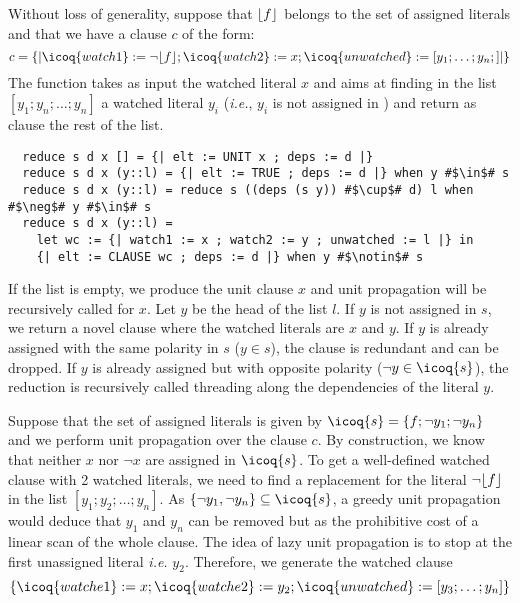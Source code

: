 \documentclass[utf8,a4paper,UKenglish,cleveref, autoref, thm-restate]{lipics-v2021}
\begin{document}
Without loss of generality, suppose that $\lfloor f \rfloor$ belongs to the set of assigned
literals  and that we have a clause $c$ of the form:
\[
  c = \{| \icoq{watch1} := \neg \Lit{f}  ; \icoq{watch2} := x ;
  \icoq{unwatched} := [y_1;\dots;y_n ;]|\}
\]
The  function takes as input the watched literal $x$ and aims at finding in the list
$[y_1; y_n;\dots; y_n]$ a watched literal $y_i$ (\emph{i.e.}, $y_i$ is not assigned in )
and return as clause the rest of the
list. %
\begin{verbatim}
  reduce s d x [] = {| elt := UNIT x ; deps := d |}
  reduce s d x (y::l) = {| elt := TRUE ; deps := d |} when y #$\in$# s
  reduce s d x (y::l) = reduce s ((deps (s y)) #$\cup$# d) l when #$\neg$# y #$\in$# s
  reduce s d x (y::l) =
    let wc := {| watch1 := x ; watch2 := y ; unwatched := l |} in
    {| elt := CLAUSE wc ; deps := d |} when y #$\notin$# s
\end{verbatim}
If the list is empty, we produce the unit clause  $x$ and unit
propagation will be recursively called for $x$.  Let $y$ be the head of the list
$l$.  If $y$ is not assigned in $s$, we return a
novel clause where the watched literals are $x$ and $y$.
%
If $y$ is already assigned with the same polarity in $s$ ($y\in s$), the clause
is redundant and can be dropped.  If $y$ is already assigned but with
opposite polarity ($\neg y \in \icoq{s}$), the reduction is recursively called threading along
the dependencies of the literal $y$.
%
\begin{example}
  Suppose that the set of assigned literals is given by
  $\icoq{s} = \{f; \neg y_1; \neg y_n \}$ and we perform unit
  propagation over the clause $c$.  By construction, we know that
  neither $x$ nor $\neg x$ are assigned in $\icoq{s}$. To get a
  well-defined watched clause with 2 watched literals, we need to find
  a replacement for the literal $\neg \lfloor f \rfloor$ in the list
  $[y_1;y_2;\ldots; y_n]$.
  As $\{\neg y_1, \neg y_n\} \subseteq  \icoq{s}$, a greedy unit propagation would deduce that
  $y_1$ and $y_n$ can be removed but as the prohibitive cost of a linear scan of the whole clause.
  The idea of lazy unit propagation is to stop at the first unassigned literal \emph{i.e.} $y_2$.
  Therefore, we generate the watched clause
  \[
    \{ \icoq{watche1} := x ; \icoq{watche2} := y_2 ; \icoq{unwatched} := [ y_3;\dots; y_n] \}
    \]
\end{example}
\end{document}
